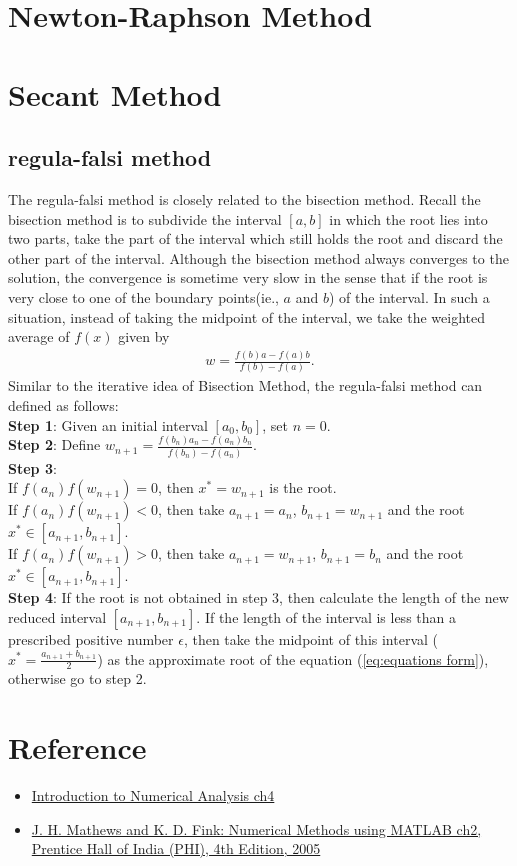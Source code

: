 \section{Newton-Raphson Method}


\section{Secant Method}

\subsection{regula-falsi method}
The regula-falsi method is closely related to the bisection method. Recall the 
bisection method is to subdivide the interval $[a,b]$ in which the root lies into 
two parts, take the part of the interval which still holds the root and discard the other part of 
the interval. Although the bisection method always converges to the solution, the convergence is 
sometime very slow in the sense that if the root is very close to one of the boundary points(ie., $a$ and $b$)
of the interval. In such a situation, instead of taking the midpoint of the interval, 
we take the weighted average of $f(x)$ given by
\begin{align*}
    w=\frac{f(b)a-f(a)b}{f(b)-f(a)}.
\end{align*}
Similar to the iterative idea of Bisection Method, the regula-falsi method can defined as follows:\\
\textbf{Step 1}: Given an initial interval $[a_0,b_0]$, set $n=0$.\\
\textbf{Step 2}: Define $w_{n+1}=\frac{f(b_n)a_n-f(a_n)b_n}{f(b_n)-f(a_n)}$.\\
\textbf{Step 3}:\\
If $f(a_n)f(w_{n+1})=0$, then $x^*=w_{n+1}$ is the root.\\
If $f(a_n)f(w_{n+1})<0$, then take $a_{n+1}=a_n$, $b_{n+1}=w_{n+1}$ and the root $x^*\in [a_{n+1},b_{n+1}]$.\\
If $f(a_n)f(w_{n+1})>0$, then take $a_{n+1}=w_{n+1}$, $b_{n+1}=b_n$ and the root $x^*\in [a_{n+1},b_{n+1}]$.
\\
\textbf{Step 4}: If the root is not obtained in step 3, then calculate the length of the new reduced interval $[a_{n+1},b_{n+1}]$.
If the length of the interval is less than a prescribed positive number $\epsilon$,
then take the midpoint of this interval ($x^*=\frac{a_{n+1}+b_{n+1}}{2}$) as the approximate root of the equation (\ref{eq:equations form}),
otherwise go to step 2.


\section{Reference}
\begin{itemize}
    \item \href{https://www.math.iitb.ac.in/~baskar/book.pdf}{Introduction to Numerical Analysis ch4}
    \item \href{}{J. H. Mathews and K. D. Fink: Numerical Methods using
    MATLAB ch2, Prentice Hall of India (PHI), 4th Edition, 2005} 
\end{itemize}